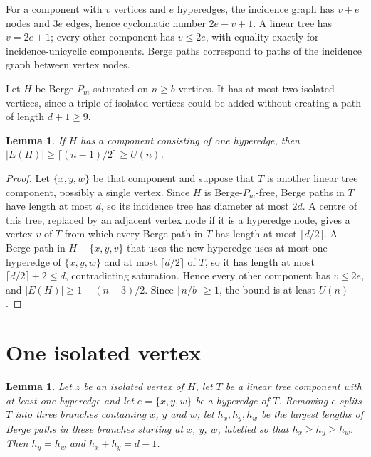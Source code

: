 \documentclass[11pt]{article}
\newtheorem{lemma}[theorem]{Lemma}
\theoremstyle{definition}
\theoremstyle{remark}
\begin{document}
For a component with $v$ vertices and $e$ hyperedges, the incidence graph
has $v+e$ nodes and $3e$ edges, hence cyclomatic number $2e-v+1$. A linear
tree has $v=2e+1$; every other component has $v\le2e$, with equality
exactly for incidence-unicyclic components. Berge paths correspond to
paths of the incidence graph between vertex nodes.

Let $H$ be Berge-$P_m$-saturated on $n\ge b$ vertices. It has at most two
isolated vertices, since a triple of isolated vertices could be added
without creating a path of length $d+1\ge9$.

\begin{lemma}\label{lem:edge}
If $H$ has a component consisting of one hyperedge, then
$|E(H)|\ge\lceil (n-1)/2\rceil\ge U(n)$.
\end{lemma}

\begin{proof}
Let $\{x,y,w\}$ be that component and suppose that $T$ is another linear
tree component, possibly a single vertex. Since $H$ is
Berge-$P_m$-free, Berge paths in $T$ have length at most $d$, so its
incidence tree has diameter at most $2d$. A centre of this tree, replaced by
an adjacent vertex node if it is a hyperedge node, gives a vertex $v$ of
$T$ from which every Berge path in $T$ has length at most $\lceil d/2\rceil$.
A Berge path in $H+\{x,y,v\}$ that uses the new hyperedge uses at most one
hyperedge of $\{x,y,w\}$ and at most $\lceil d/2\rceil$ of $T$, so it has
length at most $\lceil d/2\rceil+2\le d$, contradicting saturation. Hence every
other component has $v\le2e$, and $|E(H)|\ge 1+(n-3)/2$. Since
$\lfloor n/b\rfloor\ge1$, the bound is at least $U(n)$.
\end{proof}

\section{One isolated vertex}

\begin{lemma}\label{lem:height}
Let $z$ be an isolated vertex of $H$, let $T$ be a linear tree component
with at least one hyperedge and let $e=\{x,y,w\}$ be a hyperedge of $T$.
Removing $e$ splits $T$ into three branches containing $x$, $y$ and $w$;
let $h_x,h_y,h_w$ be the largest lengths of Berge paths in these branches
starting at $x$, $y$, $w$, labelled so that $h_x\ge h_y\ge h_w$. Then
$h_y=h_w$ and $h_x+h_y=d-1$.
\end{lemma}
\end{document}

